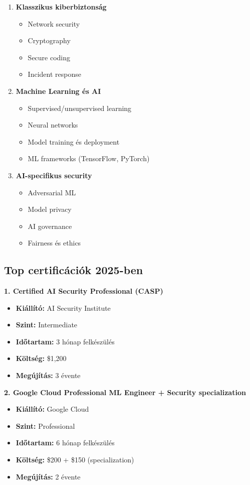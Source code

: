 \documentclass{../templates/magazine}
\begin{document}
\begin{enumerate}
    \item \textbf{Klasszikus kiberbiztonság}
    \begin{itemize}
        \item Network security
        \item Cryptography
        \item Secure coding
        \item Incident response
    \end{itemize}

    \item \textbf{Machine Learning és AI}
    \begin{itemize}
        \item Supervised/unsupervised learning
        \item Neural networks
        \item Model training és deployment
        \item ML frameworks (TensorFlow, PyTorch)
    \end{itemize}

    \item \textbf{AI-specifikus security}
    \begin{itemize}
        \item Adversarial ML
        \item Model privacy
        \item AI governance
        \item Fairness és ethics
    \end{itemize}
\end{enumerate}

\subsection{Top certificációk 2025-ben}

\textbf{1. Certified AI Security Professional (CASP)}
\begin{itemize}
    \item \textbf{Kiállító:} AI Security Institute
    \item \textbf{Szint:} Intermediate
    \item \textbf{Időtartam:} 3 hónap felkészülés
    \item \textbf{Költség:} \$1,200
    \item \textbf{Megújítás:} 3 évente
\end{itemize}

\textbf{2. Google Cloud Professional ML Engineer + Security specialization}
\begin{itemize}
    \item \textbf{Kiállító:} Google Cloud
    \item \textbf{Szint:} Professional
    \item \textbf{Időtartam:} 6 hónap felkészülés
    \item \textbf{Költség:} \$200 + \$150 (specialization)
    \item \textbf{Megújítás:} 2 évente
\end{itemize}
\end{document}
